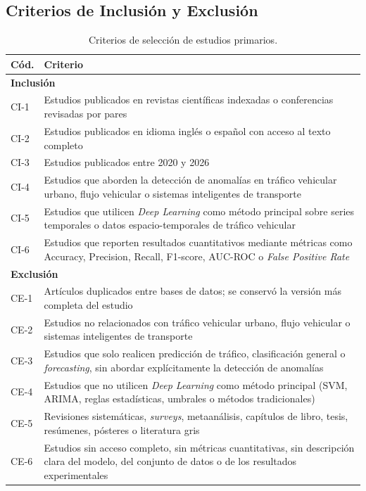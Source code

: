 \documentclass[12pt, a4paper]{article}
\begin{document}
\subsection{Criterios de Inclusi\'{o}n y Exclusi\'{o}n}

\begin{table}[H]
\centering
\caption{Criterios de selecci\'{o}n de estudios primarios.}
\label{tab:criterios}
\begin{tabularx}{\linewidth}{lX}
\toprule
\textbf{C\'{o}d.} & \textbf{Criterio} \\
\midrule
\multicolumn{2}{l}{\cellcolor{azulClaro!40}\textbf{Inclusi\'{o}n}} \\
CI-1 & Estudios publicados en revistas cient\'{i}ficas indexadas o conferencias revisadas por pares \\
CI-2 & Estudios publicados en idioma ingl\'{e}s o espa\~{n}ol con acceso al texto completo \\
CI-3 & Estudios publicados entre 2020 y 2026 \\
CI-4 & Estudios que aborden la detecci\'{o}n de anomal\'{i}as en tr\'{a}fico vehicular urbano, flujo vehicular o sistemas inteligentes de transporte \\
CI-5 & Estudios que utilicen \textit{Deep Learning} como m\'{e}todo principal sobre series temporales o datos espacio-temporales de tr\'{a}fico vehicular \\
CI-6 & Estudios que reporten resultados cuantitativos mediante m\'{e}tricas como Accuracy, Precision, Recall, F1-score, AUC-ROC o \textit{False Positive Rate} \\
\midrule
\multicolumn{2}{l}{\cellcolor{rojoAlerta!10}\textbf{Exclusi\'{o}n}} \\
CE-1 & Art\'{i}culos duplicados entre bases de datos; se conserv\'{o} la versi\'{o}n m\'{a}s completa del estudio \\
CE-2 & Estudios no relacionados con tr\'{a}fico vehicular urbano, flujo vehicular o sistemas inteligentes de transporte \\
CE-3 & Estudios que solo realicen predicci\'{o}n de tr\'{a}fico, clasificaci\'{o}n general o \textit{forecasting}, sin abordar expl\'{i}citamente la detecci\'{o}n de anomal\'{i}as \\
CE-4 & Estudios que no utilicen \textit{Deep Learning} como m\'{e}todo principal (SVM, ARIMA, reglas estad\'{i}sticas, umbrales o m\'{e}todos tradicionales) \\
CE-5 & Revisiones sistem\'{a}ticas, \textit{surveys}, metaan\'{a}lisis, cap\'{i}tulos de libro, tesis, res\'{u}menes, p\'{o}steres o literatura gris \\
CE-6 & Estudios sin acceso completo, sin m\'{e}tricas cuantitativas, sin descripci\'{o}n clara del modelo, del conjunto de datos o de los resultados experimentales \\
\bottomrule
\end{tabularx}
\end{table}
\end{document}
